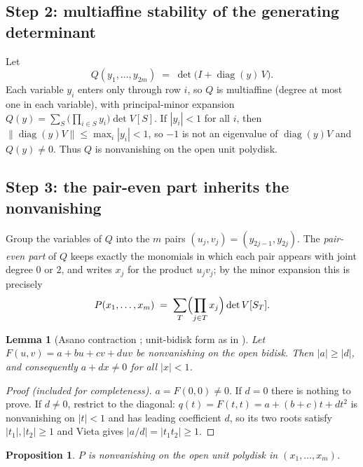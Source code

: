 \documentclass[11pt]{amsart}
\newtheorem{lemma}[theorem]{Lemma}
\newtheorem{proposition}[theorem]{Proposition}
\theoremstyle{definition}
\theoremstyle{remark}
\DeclareMathOperator{\diag}{diag}
\begin{document}
\subsection*{Step 2: multiaffine stability of the generating determinant}
Let
\[
Q(y_1, \ldots, y_{2m}) \;=\; \det\bigl(I + \diag(y)\,V\bigr).
\]
Each variable $y_i$ enters only through row $i$, so $Q$ is multiaffine (degree at most one in each variable), with principal-minor expansion $Q(y) = \sum_S \bigl(\prod_{i \in S} y_i\bigr) \det V[S]$. If $|y_i| < 1$ for all $i$, then $\|\diag(y) V\| \le \max_i |y_i| < 1$, so $-1$ is not an eigenvalue of $\diag(y)V$ and $Q(y) \ne 0$. Thus $Q$ is nonvanishing on the open unit polydisk.

\subsection*{Step 3: the pair-even part inherits the nonvanishing}
Group the variables of $Q$ into the $m$ pairs $(u_j, v_j) = (y_{2j-1}, y_{2j})$. The \emph{pair-even part} of $Q$ keeps exactly the monomials in which each pair appears with joint degree $0$ or $2$, and writes $x_j$ for the product $u_j v_j$; by the minor expansion this is precisely
\begin{equation}\label{eq:P}
P(x_1, \ldots, x_m) \;=\; \sum_{T} \Bigl(\prod_{j \in T} x_j\Bigr) \det V[S_T].
\end{equation}

\begin{lemma}[Asano contraction \cite{Asa70, Rue71}; unit-bidisk form as in {\cite[Remark after Prop.~4.19]{COSW04}}]\label{lem:extract}
Let $F(u, v) = a + bu + cv + duv$ be nonvanishing on the open bidisk. Then $|a| \ge |d|$, and consequently $a + dx \ne 0$ for all $|x| < 1$.
\end{lemma}

\begin{proof}[Proof (included for completeness)]
$a = F(0,0) \ne 0$. If $d = 0$ there is nothing to prove. If $d \ne 0$, restrict to the diagonal: $q(t) = F(t, t) = a + (b + c)t + dt^2$ is nonvanishing on $|t| < 1$ and has leading coefficient $d$, so its two roots satisfy $|t_1|, |t_2| \ge 1$ and Vieta gives $|a/d| = |t_1 t_2| \ge 1$.
\end{proof}

\begin{proposition}\label{prop:extract}
$P$ is nonvanishing on the open unit polydisk in $(x_1, \ldots, x_m)$.
\end{proposition}
\end{document}
